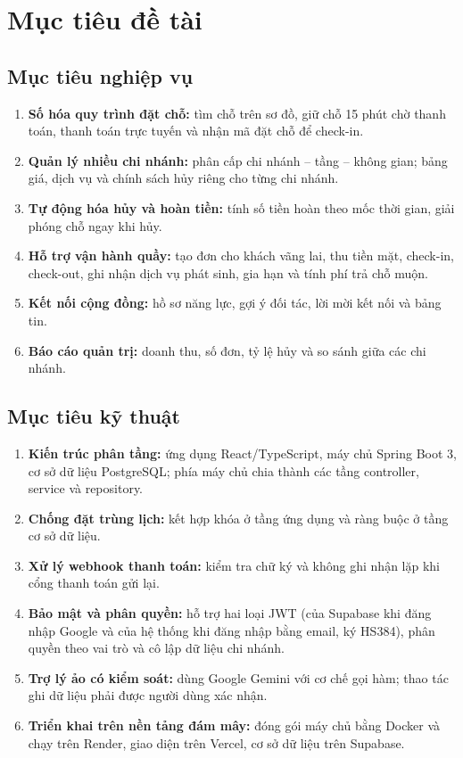 \section{Mục tiêu đề tài}
\label{sec:muctieu}

\subsection{Mục tiêu nghiệp vụ}
\begin{enumerate}
    \item \textbf{Số hóa quy trình đặt chỗ:} tìm chỗ trên sơ đồ, giữ chỗ 15 phút chờ thanh toán, thanh toán trực tuyến và nhận mã đặt chỗ để check-in.
    \item \textbf{Quản lý nhiều chi nhánh:} phân cấp chi nhánh -- tầng -- không gian; bảng giá, dịch vụ và chính sách hủy riêng cho từng chi nhánh.
    \item \textbf{Tự động hóa hủy và hoàn tiền:} tính số tiền hoàn theo mốc thời gian, giải phóng chỗ ngay khi hủy.
    \item \textbf{Hỗ trợ vận hành quầy:} tạo đơn cho khách vãng lai, thu tiền mặt, check-in, check-out, ghi nhận dịch vụ phát sinh, gia hạn và tính phí trả chỗ muộn.
    \item \textbf{Kết nối cộng đồng:} hồ sơ năng lực, gợi ý đối tác, lời mời kết nối và bảng tin.
    \item \textbf{Báo cáo quản trị:} doanh thu, số đơn, tỷ lệ hủy và so sánh giữa các chi nhánh.
\end{enumerate}

\subsection{Mục tiêu kỹ thuật}
\begin{enumerate}
    \item \textbf{Kiến trúc phân tầng:} ứng dụng React/TypeScript, máy chủ Spring Boot 3, cơ sở dữ liệu PostgreSQL; phía máy chủ chia thành các tầng controller, service và repository.
    \item \textbf{Chống đặt trùng lịch:} kết hợp khóa ở tầng ứng dụng và ràng buộc ở tầng cơ sở dữ liệu.
    \item \textbf{Xử lý webhook thanh toán:} kiểm tra chữ ký và không ghi nhận lặp khi cổng thanh toán gửi lại.
    \item \textbf{Bảo mật và phân quyền:} hỗ trợ hai loại JWT (của Supabase khi đăng nhập Google và của hệ thống khi đăng nhập bằng email, ký HS384), phân quyền theo vai trò và cô lập dữ liệu chi nhánh.
    \item \textbf{Trợ lý ảo có kiểm soát:} dùng Google Gemini với cơ chế gọi hàm; thao tác ghi dữ liệu phải được người dùng xác nhận.
    \item \textbf{Triển khai trên nền tảng đám mây:} đóng gói máy chủ bằng Docker và chạy trên Render, giao diện trên Vercel, cơ sở dữ liệu trên Supabase.
\end{enumerate}

